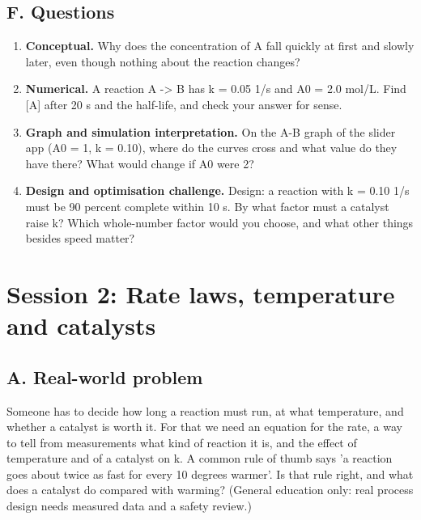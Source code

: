 \documentclass[11pt,a4paper]{article}
\begin{document}
\subsection*{F. Questions}
\begin{enumerate}[nosep]
\item \textbf{Conceptual.} Why does the concentration of A fall quickly at first and slowly later, even though nothing about the reaction changes?
\item \textbf{Numerical.} A reaction A -\textgreater{} B has k = 0.05 1/s and A0 = 2.0 mol/L. Find [A] after 20 s and the half-life, and check your answer for sense.
\item \textbf{Graph and simulation interpretation.} On the A-B graph of the slider app (A0 = 1, k = 0.10), where do the curves cross and what value do they have there? What would change if A0 were 2?
\item \textbf{Design and optimisation challenge.} Design: a reaction with k = 0.10 1/s must be 90 percent complete within 10 s. By what factor must a catalyst raise k? Which whole-number factor would you choose, and what other things besides speed matter?
\end{enumerate}

\section{Session 2: Rate laws, temperature and catalysts}

\subsection*{A. Real-world problem}
Someone has to decide how long a reaction must run, at what temperature, and whether a catalyst is worth it. For that we need an equation for the rate, a way to tell from measurements what kind of reaction it is, and the effect of temperature and of a catalyst on k. A common rule of thumb says 'a reaction goes about twice as fast for every 10 degrees warmer'. Is that rule right, and what does a catalyst do compared with warming? (General education only: real process design needs measured data and a safety review.)
\end{document}
